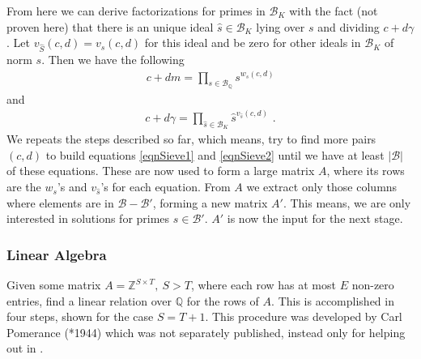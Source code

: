 \documentclass[paper=a4, fontsize=11pt]{scrartcl} %
\numberwithin{equation}{section} %
\numberwithin{figure}{section} %
\numberwithin{table}{section} %
\begin{document}
From here we can derive factorizations for primes in $\mathcal{B}_K$ with the fact (not proven here) that there is an unique ideal $\hat{s}\in\mathcal{B}_K$ lying over $s$ and dividing $c+d\gamma$. Let $v_{\hat{S}}(c,d) = v_s(c,d)$ for this ideal and be zero for other ideals in $\mathcal{B}_K$ of norm $s$. Then we have the following
\begin{eqnarray}
\label{eqnSieve1}
c+dm = \prod_{s\in\mathcal{B}_\mathbb{Q}}s^{w_s(c,d)}
\end{eqnarray}
and
\begin{eqnarray}
\label{eqnSieve2}
c+d\gamma = \prod_{\hat{s}\in\mathcal{B}_K}\hat{s}^{v_{\hat{s}}(c,d)}
\text{ .}
\end{eqnarray}
We repeats the steps described so far, which means, try to find more pairs $(c,d)$ to build equations \ref{eqnSieve1} and \ref{eqnSieve2} until we have at least $|\mathcal{B}|$ of these equations. These are now used to form a large matrix $A$, where its rows are the $w_s$'s and $v_{\hat{s}}$'s for each equation. From $A$ we extract only those columns where elements are in $\mathcal{B}-\mathcal{B}'$, forming a new matrix $A'$. This means, we are only interested in solutions for primes $s\in\mathcal{B}'$. $A'$ is now the input for the next stage.

\subsubsection{Linear Algebra}
Given some matrix $A = \mathbb{Z}^{S\times T},\ S > T$, where each row has at most $E$ non-zero entries, find a linear relation over $\mathbb{Q}$ for the rows of $A$. This is accomplished in four steps, shown for the case $S=T+1$. This procedure was developed by Carl Pomerance (*1944) which was not separately published, instead only for helping out in \citep{gordon1993discrete}.
\end{document}
